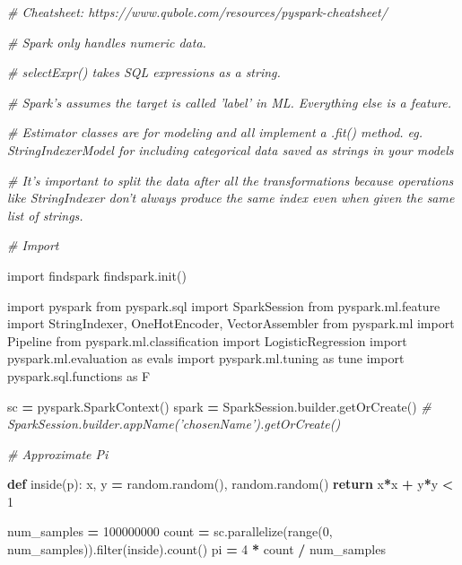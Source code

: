 \documentclass[]{book}
\newenvironment{Shaded}{\begin{snugshade}}{\end{snugshade}}
\newcommand{\BuiltInTok}[1]{#1}
\newcommand{\CommentTok}[1]{\textcolor[rgb]{0.56,0.35,0.01}{\textit{#1}}}
\newcommand{\ControlFlowTok}[1]{\textcolor[rgb]{0.13,0.29,0.53}{\textbf{#1}}}
\newcommand{\DecValTok}[1]{\textcolor[rgb]{0.00,0.00,0.81}{#1}}
\newcommand{\ImportTok}[1]{#1}
\newcommand{\KeywordTok}[1]{\textcolor[rgb]{0.13,0.29,0.53}{\textbf{#1}}}
\newcommand{\NormalTok}[1]{#1}
\newcommand{\OperatorTok}[1]{\textcolor[rgb]{0.81,0.36,0.00}{\textbf{#1}}}
\begin{document}
\begin{Shaded}
\begin{Highlighting}[]
\CommentTok{# Cheatsheet: https://www.qubole.com/resources/pyspark-cheatsheet/}

\CommentTok{# Spark only handles numeric data. }

\CommentTok{# selectExpr() takes SQL expressions as a string.}

\CommentTok{# Spark's assumes the target is called 'label' in ML. Everything else is a feature.}

\CommentTok{# Estimator classes are for modeling and all implement a .fit() method. eg. StringIndexerModel for including categorical data saved as strings in your models}

\CommentTok{# It's important to split the data after all the transformations because operations like StringIndexer don't always produce the same index even when given the same list of strings.}

\CommentTok{# Import}

\ImportTok{import}\NormalTok{ findspark}
\NormalTok{findspark.init()}

\ImportTok{import}\NormalTok{ pyspark}
\ImportTok{from}\NormalTok{ pyspark.sql }\ImportTok{import}\NormalTok{ SparkSession}
\ImportTok{from}\NormalTok{ pyspark.ml.feature }\ImportTok{import}\NormalTok{ StringIndexer, OneHotEncoder, VectorAssembler}
\ImportTok{from}\NormalTok{ pyspark.ml }\ImportTok{import}\NormalTok{ Pipeline}
\ImportTok{from}\NormalTok{ pyspark.ml.classification }\ImportTok{import}\NormalTok{ LogisticRegression}
\ImportTok{import}\NormalTok{ pyspark.ml.evaluation }\ImportTok{as}\NormalTok{ evals}
\ImportTok{import}\NormalTok{ pyspark.ml.tuning }\ImportTok{as}\NormalTok{ tune}
\ImportTok{import}\NormalTok{ pyspark.sql.functions }\ImportTok{as}\NormalTok{ F}

\NormalTok{sc }\OperatorTok{=}\NormalTok{ pyspark.SparkContext()}
\NormalTok{spark }\OperatorTok{=}\NormalTok{ SparkSession.builder.getOrCreate() }\CommentTok{# SparkSession.builder.appName('chosenName').getOrCreate()}

\CommentTok{# Approximate Pi}

\KeywordTok{def}\NormalTok{ inside(p):     }
\NormalTok{    x, y }\OperatorTok{=}\NormalTok{ random.random(), random.random()}
    \ControlFlowTok{return}\NormalTok{ x}\OperatorTok{*}\NormalTok{x }\OperatorTok{+}\NormalTok{ y}\OperatorTok{*}\NormalTok{y }\OperatorTok{<} \DecValTok{1}
    
\NormalTok{num_samples }\OperatorTok{=} \DecValTok{100000000}
\NormalTok{count }\OperatorTok{=}\NormalTok{ sc.parallelize(}\BuiltInTok{range}\NormalTok{(}\DecValTok{0}\NormalTok{, num_samples)).}\BuiltInTok{filter}\NormalTok{(inside).count()}
\NormalTok{pi }\OperatorTok{=} \DecValTok{4} \OperatorTok{*}\NormalTok{ count }\OperatorTok{/}\NormalTok{ num_samples}


\end{Highlighting}
\end{Shaded}
\end{document}
